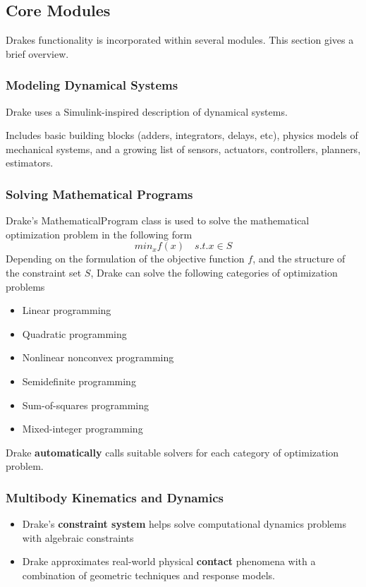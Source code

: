 \subsection{Core Modules}
Drakes functionality is incorporated within several modules. This section gives a brief overview. 
\subsubsection{Modeling Dynamical Systems}
Drake uses a Simulink-inspired description of dynamical systems.

Includes basic building blocks (adders, integrators, delays, etc), physics models of mechanical systems, and a growing list of sensors, actuators, controllers, planners, estimators.
\subsubsection{Solving Mathematical Programs}
Drake's MathematicalProgram class is used to solve the mathematical optimization problem in the following form
$$min_{x} f(x) \quad s.t. x \in S$$
Depending on the formulation of the objective function $f$, and the structure of the constraint set $S$, Drake can solve the following categories of optimization problems
\begin{itemize}
\item Linear programming
\item Quadratic programming 
\item Nonlinear nonconvex programming
\item Semidefinite programming
\item Sum-of-squares programming
\item Mixed-integer programming
\end{itemize}
Drake \textbf{automatically} calls suitable solvers for each category of optimization problem.
\subsubsection{Multibody Kinematics and Dynamics}
\begin{itemize}
\item Drake's \textbf{constraint system} helps solve computational dynamics problems with algebraic constraints
\item Drake approximates real-world physical \textbf{contact} phenomena with a combination of geometric techniques and response models.
\end{itemize}


